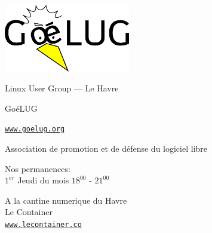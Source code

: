 
\includegraphics[width=5.5cm]{../logo/goelug_proposition1/goelug_logo_t1}

Linux User Group --- Le Havre

\vspace{18pt}

\huge

Go\'{e}LUG


\normalsize

\href{http://www.goelug.org}{\tt www.goelug.org}

\vspace{18pt}

Association de promotion et de d\'{e}fense du logiciel libre

\vspace{42pt}

\textsf{Nos permanences:} \\[11pt]
$ 1^{er} $ Jeudi du mois $ 18^{00} $ - $ 21^{00} $ \\

\vspace{34pt}

A la cantine numerique du Havre \\
Le Container \\
\href{http://www.lecontainer.co}{\tt www.lecontainer.co}
